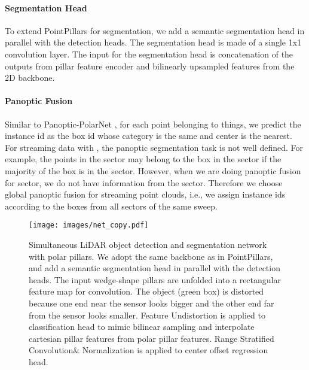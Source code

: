 \documentclass{article}
\begin{document}
\vspace{-3.5mm}\paragraph{Segmentation Head} To extend PointPillars for segmentation, we add a semantic segmentation head in parallel with the detection heads. The segmentation head is made of a single 1x1 convolution layer. The input for the segmentation head is concatenation of the outputs from pillar feature encoder and bilinearly upsampled features from the 2D backbone.

\vspace{-3.5mm}\paragraph{Panoptic Fusion}\label{fusion} Similar to Panoptic-PolarNet \cite{zhou2021panoptic}, for each point belonging to things, we predict the instance id as the box id whose category is the same and center is the nearest. For streaming data with , the panoptic segmentation task is not well defined. For example, the points in the  sector may belong to the box in the  sector if the majority of the box is in the  sector. However, when we are doing panoptic fusion for  sector, we do not have information from the  sector. Therefore we choose global panoptic fusion for streaming point clouds, i.e., we assign instance ids according to the boxes from all sectors of the same sweep. 







\begin{figure}
  \centering 
\texttt{[image: images/net\_copy.pdf]}
  \caption{Simultaneous LiDAR object detection and segmentation network with polar pillars. We adopt the same backbone as in PointPillars\cite{lang2019pointpillars}, and add a semantic segmentation head in parallel with the detection heads. The input wedge-shape pillars are unfolded into a rectangular feature map for convolution. The object (green box) is distorted because one end near the sensor looks bigger and the other end far from the sensor looks smaller. Feature Undistortion is applied to classification head to mimic bilinear sampling and interpolate cartesian pillar features from polar pillar features. Range Stratified Convolution\& Normalization is applied to center offset regression head. }\label{fig:net}
\end{figure}
\end{document}
